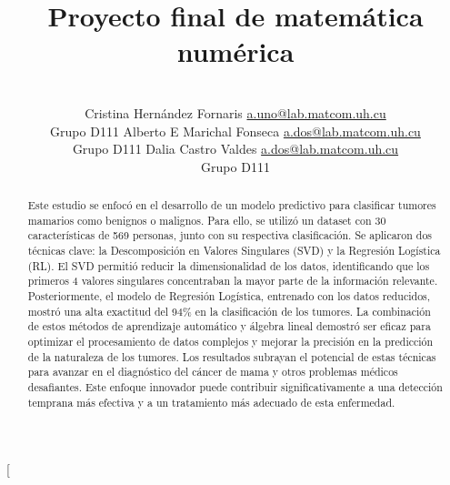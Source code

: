\documentclass[a4paper,10pt,twocolumn]{article}
\title{Proyecto final de matemática numérica}
\author{\\
\name Cristina Hernández Fornaris \email \href{mailto:a.uno@lab.matcom.uh.cu}{a.uno@lab.matcom.uh.cu}
	\\ \addr Grupo D111 \AND
\name Alberto E Marichal Fonseca \email \href{mailto:a.dos@lab.matcom.uh.cu}{a.dos@lab.matcom.uh.cu}
  \\ \addr Grupo D111\AND
\name Dalia Castro Valdes \email \href{mailto:a.dos@lab.matcom.uh.cu}{a.dos@lab.matcom.uh.cu}
  \\ \addr Grupo D111}
\begin{document}
\twocolumn[

\maketitle


\begin{abstract}

	Este estudio se enfocó en el desarrollo de un modelo predictivo para clasificar tumores mamarios como benignos o malignos. Para ello, se utilizó un dataset con 30 características de 569 personas, junto con su respectiva clasificación. Se aplicaron dos técnicas clave: la Descomposición en Valores Singulares (SVD) y la Regresión Logística (RL). El SVD permitió reducir la dimensionalidad de los datos, identificando que los primeros 4 valores singulares concentraban la mayor parte de la información relevante. Posteriormente, el modelo de Regresión Logística, entrenado con los datos reducidos, mostró una alta exactitud del 94\% en la clasificación de los tumores. La combinación de estos métodos de aprendizaje automático y álgebra lineal demostró ser eficaz para optimizar el procesamiento de datos complejos y mejorar la precisión en la predicción de la naturaleza de los tumores. Los resultados subrayan el potencial de estas técnicas para avanzar en el diagnóstico del cáncer de mama y otros problemas médicos desafiantes. Este enfoque innovador puede contribuir significativamente a una detección temprana más efectiva y a un tratamiento más adecuado de esta enfermedad.

\end{abstract}

\vspace{0.5cm}
\end{document}
